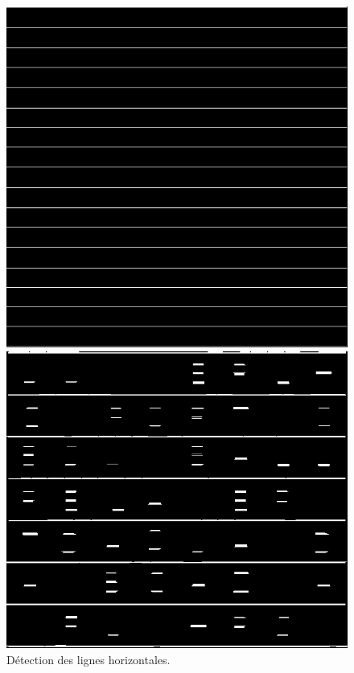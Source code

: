 \documentclass{article}
\begin{document}
\begin{figure}[H]
  \centering
      \includegraphics[width=\linewidth]{ressources/1step_09_horizontal_lines.png}
      \caption{}
    \endminipage\quad\quad\quad\quad
    \includegraphics[width=\linewidth]{ressources/3step_09_horizontal_lines.png}
    \caption{}
  \endminipage
  \caption{Détection des lignes horizontales.}
\end{figure}
\end{document}
